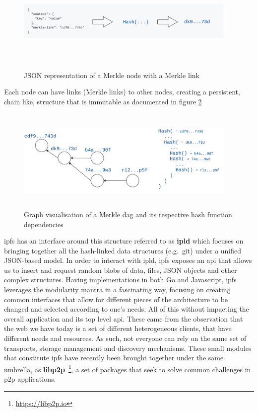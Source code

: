 \begin{figure}[hb!]
  \centering
  \includegraphics[max height=5cm,max width=0.95\textwidth]{../images/merkle-node.png}
  \caption{JSON representation of a Merkle node with a Merkle link}
  \label{fig:merkle-node}
\end{figure}

Each node can have links (Merkle links) to other nodes, creating a persistent,
chain like, structure that is immutable as documented in figure
\ref{fig:merkle-dag}

\begin{figure}[hb!]
  \centering
  \includegraphics[max height=5cm,max width=0.95\textwidth]{../images/merkle-dag.png}
  \caption{Graph visualisation of a Merkle \acrshort{dag} and its respective hash function dependencies}
  \label{fig:merkle-dag}
\end{figure}

\acrshort{ipfs} has an interface around this structure referred to as
\textbf{\acrfull{ipld}} which focuses on bringing together all the hash-linked
data structures (e.g.~git) under a unified JSON-based model. In order to
interact with \acrshort{ipld}, \acrshort{ipfs} exposes an \acrshort{api} that
allows us to insert and request random blobs of data, files, JSON objects and
other complex structures. Having implementations in both Go and Javascript,
\acrshort{ipfs} leverages the modularity mantra in a fascinating way, focusing
on creating common interfaces that allow for different pieces of the
architecture to be changed and selected according to one's needs.  All of this
without impacting the overall application and its top level \acrshort{api}.
These came from the observation that the web we have today is a set of
different heterogeneous clients, that have different needs and resources. As
such, not everyone can rely on the same set of transports, storage management
and discovery mechanisms. These small modules that constitute \acrshort{ipfs}
have recently been brought together under the same umbrella, as
\textbf{libp2p}~\footnote{\url{https://libp2p.io}}, a set of packages that seek to
solve common challenges in \acrshort{p2p} applications. 

